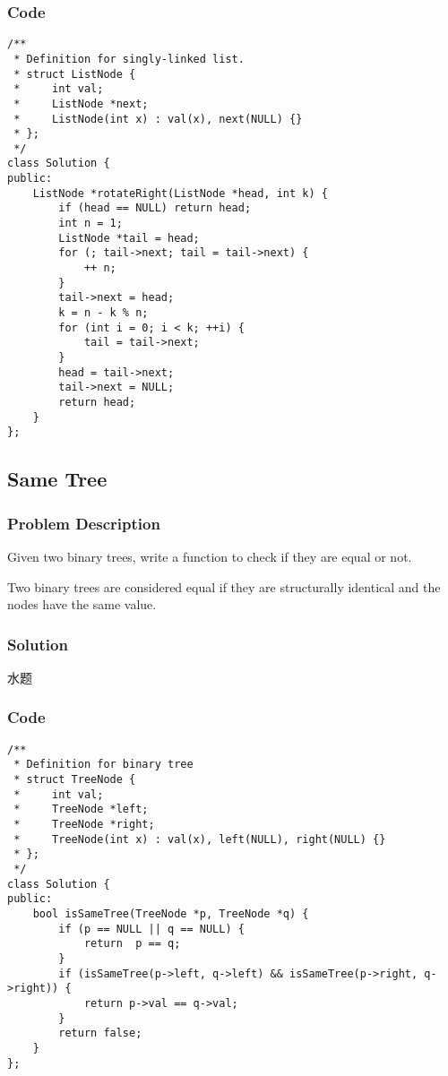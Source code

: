 \documentclass[courier]{article}
\begin{document}
\begin{CJK*}{UTF8}{gkai}
\subsubsection*{Code}
\begin{lstlisting}
/**
 * Definition for singly-linked list.
 * struct ListNode {
 *     int val;
 *     ListNode *next;
 *     ListNode(int x) : val(x), next(NULL) {}
 * };
 */
class Solution {
public:
    ListNode *rotateRight(ListNode *head, int k) {
        if (head == NULL) return head;
        int n = 1;
        ListNode *tail = head;
        for (; tail->next; tail = tail->next) {
            ++ n;
        }
        tail->next = head;
        k = n - k % n;
        for (int i = 0; i < k; ++i) {
            tail = tail->next;
        }
        head = tail->next;
        tail->next = NULL;
        return head;
    }
}; 
\end{lstlisting}


\subsection{ Same Tree }

\subsubsection*{Problem Description}
Given two binary trees, write a function to check if they are equal or not.

Two binary trees are considered equal if they are structurally identical and the nodes have the same value.



\subsubsection*{Solution}
水题

\subsubsection*{Code}
\begin{lstlisting}
/**
 * Definition for binary tree
 * struct TreeNode {
 *     int val;
 *     TreeNode *left;
 *     TreeNode *right;
 *     TreeNode(int x) : val(x), left(NULL), right(NULL) {}
 * };
 */
class Solution {
public:
    bool isSameTree(TreeNode *p, TreeNode *q) {
        if (p == NULL || q == NULL) {
            return  p == q;
        }
        if (isSameTree(p->left, q->left) && isSameTree(p->right, q->right)) {
            return p->val == q->val;
        }
        return false;
    }
}; 
\end{lstlisting}



\end{CJK*}
\end{document}
